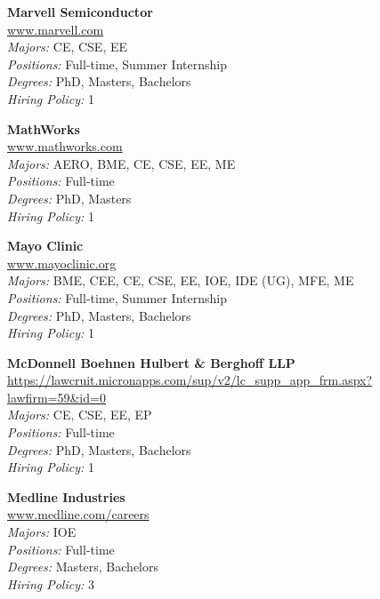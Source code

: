 \documentclass[twoside]{article}
\begin{document}
\begin{center}
\begin{multicols}{3}
\begin{minipage}{.9\columnwidth}{\Large\bf Marvell Semiconductor }\\
	\url{www.marvell.com}\\
	\emph{Majors:} CE, CSE, EE\\
	\emph{Positions:} Full-time, Summer Internship\\
	\emph{Degrees:} PhD, Masters, Bachelors\\
	\emph{Hiring Policy:} 1\\
\end{minipage}
 
\begin{minipage}{.9\columnwidth}{\Large\bf MathWorks }\\
	\url{www.mathworks.com}\\
	\emph{Majors:} AERO, BME, CE, CSE, EE, ME\\
	\emph{Positions:} Full-time\\
	\emph{Degrees:} PhD, Masters\\
	\emph{Hiring Policy:} 1\\
\end{minipage}
 
\begin{minipage}{.9\columnwidth}{\Large\bf Mayo Clinic }\\
	\url{www.mayoclinic.org}\\
	\emph{Majors:} BME, CEE, CE, CSE, EE, IOE, IDE (UG), MFE, ME\\
	\emph{Positions:} Full-time, Summer Internship\\
	\emph{Degrees:} PhD, Masters, Bachelors\\
	\emph{Hiring Policy:} 1\\
\end{minipage}
 
\begin{minipage}{.9\columnwidth}{\Large\bf McDonnell Boehnen Hulbert \& Berghoff LLP }\\
	\url{https://lawcruit.micronapps.com/sup/v2/lc_supp_app_frm.aspx?lawfirm=59&id=0}\\
	\emph{Majors:} CE, CSE, EE, EP\\
	\emph{Positions:} Full-time\\
	\emph{Degrees:} PhD, Masters, Bachelors\\
	\emph{Hiring Policy:} 1\\
\end{minipage}
 
\begin{minipage}{.9\columnwidth}{\Large\bf Medline Industries }\\
	\url{www.medline.com/careers}\\
	\emph{Majors:} IOE\\
	\emph{Positions:} Full-time\\
	\emph{Degrees:} Masters, Bachelors\\
	\emph{Hiring Policy:} 3\\
\end{minipage}
 

\end{multicols}
\end{center}
\end{document}
